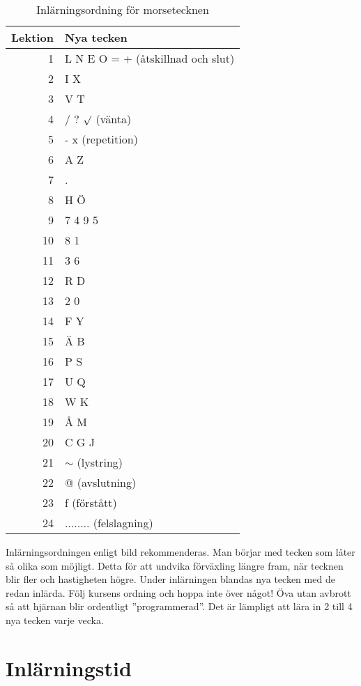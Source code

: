 \begin{table}[ht]
  \centering
   \begin{tabular}{|r|l|}
  	\hline
  	\textbf{Lektion} & \textbf{Nya tecken} \\ \hline
  	1 & L N E O = + (åtskillnad och slut) \\
  	2 & I X \\
  	3 & V T \\
  	4 & / ? $\surd$ (vänta) \\
  	5 & - x (repetition) \\
  	6 & A Z \\
  	7 & . \\
  	8 & H Ö \\
  	9 & 7 4 9 5 \\
  	10 & 8 1 \\
  	11 & 3 6 \\
  	12 & R D \\
  	13 & 2 0 \\
  	14 & F Y \\
  	15 & Ä B \\
  	16 & P S \\
  	17 & U Q \\
  	18 & W K \\
  	19 & Å M \\
  	20 & C G J \\
  	21 & $\sim$ (lystring) \\
  	22 & @ (avslutning) \\
  	23 & f (förstått) \\
  	24 & ........ (felslagning) \\
  	\hline
  \end{tabular}
  \caption{Inlärningsordning för morsetecknen}
  \label{fig:morse_ordning}
\end{table}

Inlärningsordningen enligt bild  rekommenderas.
Man börjar med tecken som låter så olika som möjligt.
Detta för att undvika förväxling längre fram, när tecknen blir fler och
hastigheten högre.
Under inlärningen blandas nya tecken med de redan inlärda.
Följ kursens ordning och hoppa inte över något!
Öva utan avbrott så att hjärnan blir ordentligt ''programmerad''.
Det är lämpligt att lära in 2 till 4 nya tecken varje vecka.

\section{Inlärningstid}

